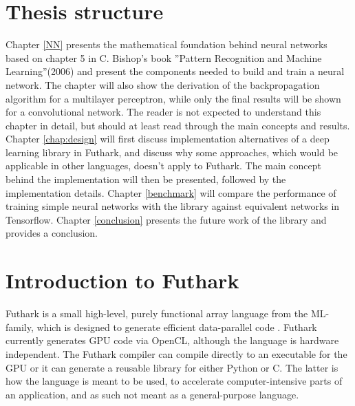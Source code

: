\section{Thesis structure}
{Chapter} \ref{NN} presents the mathematical foundation behind neural networks
based on chapter 5 in C. Bishop's book ''Pattern Recognition and Machine
Learning''(2006) and present the components needed to build and train a neural
network. 
The chapter will also show the derivation of the backpropagation algorithm for a
multilayer perceptron, while only the final results will be shown for a
convolutional network.
The reader is not expected to understand this chapter in detail, but should at
least read through the main concepts and results. 
{Chapter} \ref{chap:design} will first discuss implementation alternatives of a
deep learning library in Futhark, and discuss why some approaches, which would
be applicable in other languages, doesn't apply to Futhark. 
The main concept behind the implementation will then be presented, followed by
the implementation details. 
{Chapter} \ref{benchmark} will compare the performance of training simple neural
networks with the library against equivalent networks in Tensorflow. 
{Chapter} \ref{conclusion} presents the future work of the library and provides
a conclusion. 


\section{Introduction to Futhark}
Futhark is a small high-level, purely functional array language from the
ML-family, which is designed to generate efficient data-parallel code
\cite{Henriksen:2017:FPF:3140587.3062354}. 
Futhark currently generates GPU code via OpenCL, although the language is
hardware independent. 
The Futhark compiler can compile directly to an executable for the GPU or it can
generate a reusable library for either Python or C. 
The latter is how the language is meant to be used, to accelerate
computer-intensive parts of an application, and as such not meant as a
general-purpose language. \newline 

